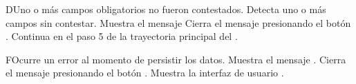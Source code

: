 
\begin{UCtrayectoriaA}{D}{Uno o más campos obligatorios no fueron contestados.}
	\UCpaso Detecta uno o más campos sin contestar.
    \UCpaso Muestra el mensaje 
    \UCpaso[\UCactor] Cierra el mensaje presionando el botón .
    \UCpaso Continua en el paso 5 de la trayectoria principal del .
\end{UCtrayectoriaA}


\begin{UCtrayectoriaA}{F}{Ocurre un error al momento de persistir los datos.}
	\UCpaso Muestra el mensaje .
	\UCpaso[\UCactor] Cierra el mensaje presionando el botón .
	\UCpaso Muestra la interfaz de usuario .
\end{UCtrayectoriaA}